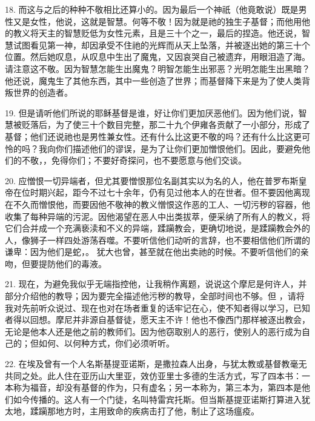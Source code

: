 18. 而这与之后的种种不敬相比还算小的。因为最后一个神祇（他竟敢说）既是男性又是女性，他说，这就是智慧。何等不敬！因为就是祂的独生子基督；而他用他的教义将天主的智慧贬低为女性元素，且是三十个之一，最后的捏造。他还说，智慧试图看见第一神，却因承受不住祂的光辉而从天上坠落，并被逐出她的第三十个位置。然后她叹息，从叹息中生出了魔鬼，又因哀哭自己被遗弃，用眼泪造了海。请注意这不敬。因为智慧怎能生出魔鬼？明智怎能生出邪恶？光明怎能生出黑暗？他还说，魔鬼生了其他东西，其中一些创造了世界；而基督降下来是为了使人类背叛世界的创造者。\par

19. 但是请听他们所说的耶稣基督是谁，好让你们更加厌恶他们。因为他们说，智慧被贬落后，为了使三十个数目完整，那二十九个伊雍各贡献了一小部分，形成了基督；他们还说祂也是男性兼女性。还有什么比这更不敬的吗？还有什么比这更可怜的吗？我向你们描述他们的谬误，是为了让你们更加憎恨他们。因此，要避免他们的不敬，，免得你们；不要好奇探问，也不要愿意与他们交谈。\par

20. 应憎恨一切异端者，但尤其要憎恨那位名副其实以为名的人，他在普罗布斯皇帝在位时期兴起，距今不过七十余年，仍有见过他本人的在世者。但不要因他离现在不久而憎恨他，而要因他不敬神的教义憎恨这作恶的工人、一切污秽的容器，他收集了每种异端的污泥。因他渴望在恶人中出类拔萃，便采纳了所有人的教义，将它们合并成一个充满亵渎和不义的异端，蹂躏教会，更确切地说，是蹂躏教会外的人，像狮子一样四处游荡吞噬。不要听信他们动听的言辞，也不要相信他们所谓的谦卑：因为他们是蛇，。 犹大也曾，甚至就在他出卖祂的时候。不要听信他们的亲吻，但要提防他们的毒液。\par

21. 现在，为避免我似乎无端指控他，让我稍作离题，说说这个摩尼是何许人，并部分介绍他的教导；因为要完全描述他污秽的教导，全部时间也不够。但 ，请将我对先前听众说过、现在也对在场者重复的话牢记在心，使不知者得以学习，已知者得以回想。摩尼并非源自基督徒，愿天主不许！他也不像西门那样被逐出教会，无论是他本人还是他之前的教师们。因为他窃取别人的恶行，使别人的恶行成为自己的；但如何、以何种方式，你们必须听听。\par

22. 在埃及曾有一个人名斯基提亚诺斯，是撒拉森人出身，与犹太教或基督教毫无共同之处。此人住在亚历山大里亚，效仿亚里士多德的生活方式，写了四本书：一本称为福音，却没有基督的作为，只有虚名；另一本称为，第三本为，第四本是他们如今传播的。这人有一个门徒，名叫特雷宾托斯。但当斯基提亚诺斯打算进入犹太地，蹂躏那地方时，主用致命的疾病击打了他，制止了这场瘟疫。\par


